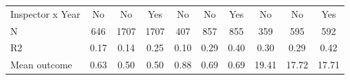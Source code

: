 \begin{tabular}{lccc|ccc|ccc}
Inspector x Year&          No         &          No         &         Yes         &          No         &          No         &         Yes         &          No         &          No         &         Yes         \\
N           &         646         &        1707         &        1707         &         407         &         857         &         855         &         359         &         595         &         592         \\
R2          &        0.17         &        0.14         &        0.25         &        0.10         &        0.29         &        0.40         &        0.30         &        0.29         &        0.42         \\
Mean outcome&        0.63         &        0.50         &        0.50         &        0.88         &        0.69         &        0.69         &       19.41         &       17.72         &       17.71         \\
\bottomrule \end{tabular}

